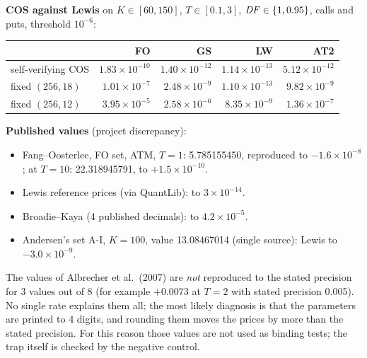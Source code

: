 \begin{progetto}[title={In the qpricer project: checks of the Fourier part}]
\textbf{COS against Lewis} on $K\in[60,150]$, $T\in[0.1,3]$, $\mathit{DF}\in\{1,0.95\}$, calls and puts, threshold
$10^{-6}$:
\begin{center}
\small
\begin{tabular}{@{}lrrrr@{}}
\toprule
 & FO & GS & LW & AT2\\
\midrule
self-verifying COS & ${1.83\times10^{-10}}$ & ${1.40\times10^{-12}}$ & ${1.14\times10^{-13}}$ & ${5.12\times10^{-12}}$\\
fixed $(256,18)$ & ${1.01\times10^{-7}}$ & ${2.48\times10^{-9}}$ & ${1.10\times10^{-13}}$ & ${9.82\times10^{-9}}$\\
fixed $(256,12)$ & ${3.95\times10^{-5}}$ & ${2.58\times10^{-6}}$ & ${8.35\times10^{-9}}$ & ${1.36\times10^{-7}}$\\
\bottomrule
\end{tabular}
\end{center}

\textbf{Published values} (project discrepancy):
\begin{itemize}
\item Fang--Oosterlee, FO set, ATM, $T=1$: 5.785155450, reproduced to $-{1.6\times10^{-8}}$; at $T=10$:
22.318945791, to $+{1.5\times10^{-10}}$.
\item Lewis reference prices (via QuantLib): to ${3\times10^{-14}}$.
\item Broadie--Kaya (4 published decimals): to ${4.2\times10^{-5}}$.
\item Andersen's set A-I, $K=100$, value 13.08467014 (single source): Lewis to $-{3.0\times10^{-9}}$.
\end{itemize}
The values of Albrecher et al.\ (2007) are \emph{not} reproduced to the stated precision for 3 values out of 8 (for
example $+0.0073$ at $T=2$ with stated precision 0.005). No single rate explains them all; the most likely diagnosis is
that the parameters are printed to 4 digits, and rounding them moves the prices by more than the stated precision.
For this reason those values are not used as binding tests; the trap itself is checked by the negative control.
\end{progetto}

